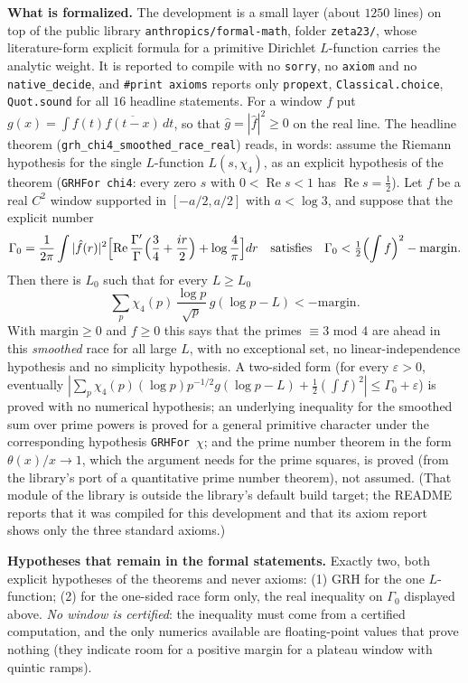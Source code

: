 \documentclass[11pt]{amsart}
\theoremstyle{definition}
\numberwithin{equation}{section}
\newcommand{\eps}{\varepsilon}
\newcommand{\re}{\operatorname{Re}}
\begin{document}
\begin{sloppypar}
\medskip\noindent\textbf{What is formalized.} The development is a
small layer (about $1250$ lines) on top of the public library
\texttt{anthropics/formal-math}, folder \texttt{zeta23/}, whose
literature-form explicit formula for a primitive Dirichlet
$L$-function carries the analytic weight. It is reported to compile
with no \texttt{sorry}, no \texttt{axiom} and no
\texttt{native\_decide}, and \texttt{\#print axioms} reports only
\texttt{propext}, \texttt{Classical.choice}, \texttt{Quot.sound} for
all $16$ headline statements. For a window $f$ put
$g(x)=\int f(t)\overline{f(t-x)}\,dt$, so that $\hat g=|\hat f|^2\ge0$
on the real line. The headline theorem
(\texttt{grh\_chi4\_smoothed\_race\_real}) reads, in words: assume
the Riemann hypothesis for the single $L$-function $L(s,\chi_4)$, as
an explicit hypothesis of the theorem
(\texttt{GRHFor chi4}: every zero $s$ with $0<\re s<1$ has
$\re s=\tfrac12$). Let $f$ be a real $C^2$ window supported in
$[-a/2,a/2]$ with $a<\log3$, and suppose that the explicit number
\[
\Gamma_0=\frac1{2\pi}\int|\hat f(r)|^2\Bigl[\re\frac{\Gamma'}{\Gamma}
\Bigl(\frac34+\frac{ir}2\Bigr)+\log\frac4\pi\Bigr]dr
\quad\text{satisfies}\quad
\Gamma_0<\tfrac12\Bigl(\int f\Bigr)^2-\mathrm{margin}.
\]
Then there is $L_0$ such that for every $L\ge L_0$
\[
\sum_p\chi_4(p)\,\frac{\log p}{\sqrt p}\,g(\log p-L)<-\mathrm{margin}.
\]
With $\mathrm{margin}\ge0$ and $f\ge0$ this says that the primes
$\equiv3$ mod $4$ are ahead in this \emph{smoothed} race for all
large $L$, with no exceptional set, no linear-independence
hypothesis and no simplicity hypothesis. A two-sided form (for every
$\eps>0$, eventually
$|\sum_p\chi_4(p)(\log p)p^{-1/2}g(\log p-L)+\tfrac12(\int f)^2|
\le\Gamma_0+\eps$) is proved with no numerical hypothesis; an
underlying inequality for the smoothed sum over prime powers is
proved for a general primitive character under the corresponding
hypothesis \texttt{GRHFor}~$\chi$; and the prime number theorem in
the form $\theta(x)/x\to1$, which the argument needs for the prime
squares, is proved (from the library's port of a quantitative prime
number theorem), not assumed. (That module of the library is outside
the library's default build target; the README reports that it was
compiled for this development and that its axiom report shows only
the three standard axioms.)
\end{sloppypar}

\medskip\noindent\textbf{Hypotheses that remain in the formal
statements.} Exactly two, both explicit hypotheses of the theorems
and never axioms: (1) GRH for the one $L$-function; (2) for the
one-sided race form only, the real inequality on $\Gamma_0$ displayed
above. \emph{No window is certified}: the inequality must come from a
certified computation, and the only numerics available are
floating-point values that prove nothing (they indicate room for a
positive margin for a plateau window with quintic ramps).
\end{document}
